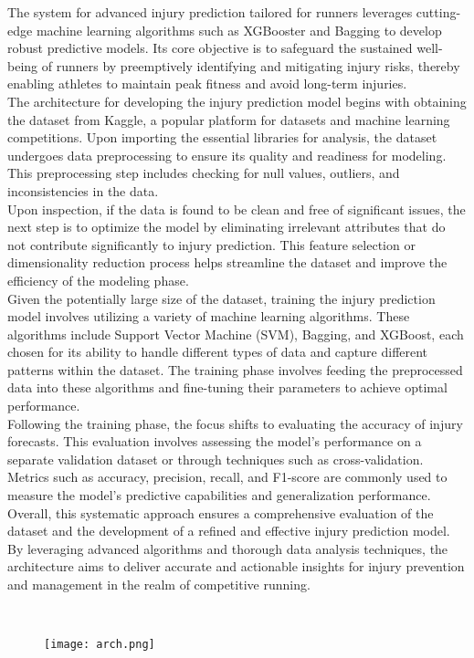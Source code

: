 \documentclass[12pt, English]{article}
\newcommand\tab[1][1cm]{\hspace*{#1}}
\begin{document}
\begin{normalsize}
\begin{normalsize}
\tab The system for advanced injury prediction tailored for runners leverages cutting-edge machine learning algorithms such as XGBooster and Bagging to develop robust predictive models. Its core objective is to safeguard the sustained well-being of runners by preemptively identifying and mitigating injury risks, thereby enabling athletes to maintain peak fitness and avoid long-term injuries.\\

\tab The architecture for developing the injury prediction model begins with obtaining the dataset from Kaggle, a popular platform for datasets and machine learning competitions. Upon importing the essential libraries for analysis, the dataset undergoes data preprocessing to ensure its quality and readiness for modeling. This preprocessing step includes checking for null values, outliers, and inconsistencies in the data.\\

\tab Upon inspection, if the data is found to be clean and free of significant issues, the next step is to optimize the model by eliminating irrelevant attributes that do not contribute significantly to injury prediction. This feature selection or dimensionality reduction process helps streamline the dataset and improve the efficiency of the modeling phase.\\

\tab Given the potentially large size of the dataset, training the injury prediction model involves utilizing a variety of machine learning algorithms. These algorithms include Support Vector Machine (SVM), Bagging, and XGBoost, each chosen for its ability to handle different types of data and capture different patterns within the dataset. The training phase involves feeding the preprocessed data into these algorithms and fine-tuning their parameters to achieve optimal performance.\\

\tab Following the training phase, the focus shifts to evaluating the accuracy of injury forecasts. This evaluation involves assessing the model's performance on a separate validation dataset or through techniques such as cross-validation. Metrics such as accuracy, precision, recall, and F1-score are commonly used to measure the model's predictive capabilities and generalization performance.\\

\tab Overall, this systematic approach ensures a comprehensive evaluation of the dataset and the development of a refined and effective injury prediction model. By leveraging advanced algorithms and thorough data analysis techniques, the architecture aims to deliver accurate and actionable insights for injury prevention and management in the realm of competitive running.
\end{normalsize}
\\
\begin{figure}[htb]
\begin{center}
\texttt{[image: arch.png]}
\end{center}


\end{figure}
\end{normalsize}
\end{document}
